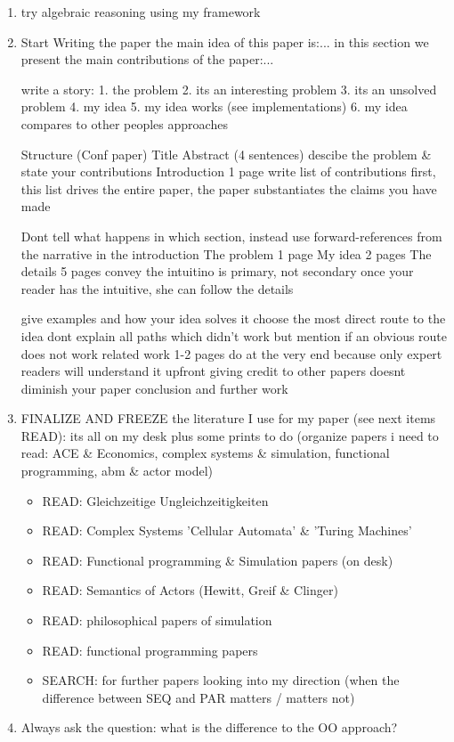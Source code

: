 \begin{enumerate}
\item try algebraic reasoning using my framework

\item Start Writing the paper
the main idea of this paper is:...
in this section we present the main contributions of the paper:...

write a story:
	1. the problem
	2. its an interesting problem
	3. its an unsolved problem
	4. my idea
	5. my idea works (see implementations)
	6. my idea compares to other peoples approaches
	
Structure (Conf paper)
	Title
	Abstract (4 sentences)
		descibe the problem & state your contributions
	Introduction 1 page
		write list of contributions first,
		this list drives the entire paper,
		the paper substantiates the claims you have made
		
		Dont tell what happens in which section,
		instead use forward-references from the
		narrative in the introduction
	The problem 1 page
	My idea 2 pages
	The details 5 pages
		convey the intuitino is primary, not secondary
		once your reader has the intuitive, she can follow the details
		
		give examples and how your idea solves it
		choose the most direct route to the idea
			dont explain all paths which didn't work
			but mention if an obvious route does not work
	related work 1-2 pages
		do at the very end because only expert readers will understand it upfront
		giving credit to other papers doesnt diminish your paper
	conclusion and further work


\item FINALIZE AND FREEZE the literature I use for my paper (see next items READ): its all on my desk plus some prints to do (organize papers i need to read: ACE \& Economics, complex systems \& simulation, functional programming, abm \& actor model)
	\begin{itemize}
		\item READ: Gleichzeitige Ungleichzeitigkeiten
		\item READ: Complex Systems 'Cellular Automata' \& 'Turing Machines'
		\item READ: Functional programming \& Simulation papers (on desk)
		\item READ: Semantics of Actors (Hewitt, Greif \& Clinger)
		\item READ: philosophical papers of simulation
		\item READ: functional programming papers
		\item SEARCH: for further papers looking into my direction (when the difference between SEQ and PAR matters / matters not)
	\end{itemize}

\item Always ask the question: what is the difference to the OO approach? 
\end{enumerate} 

